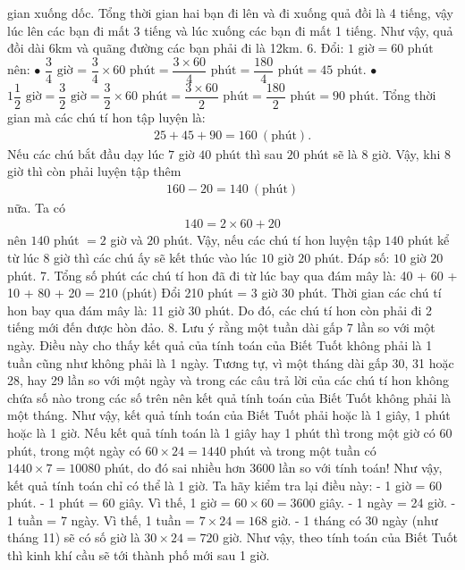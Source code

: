 gian xuống dốc. Tổng thời gian hai bạn đi lên và đi xuống quả đồi là 4 tiếng, vậy lúc lên các bạn đi mất 3 tiếng và lúc xuống các bạn đi mất 1 tiếng.
Như vậy, quả đồi dài 6km và quãng đường các bạn phải đi là 12km.
\vskip 0.1cm
6. Đổi: $1 \mbox{ giờ} = 60 \mbox{ phút}$ nên: 
\vskip 0.1cm
$\bullet$ $\dfrac{3}{4} \mbox{ giờ}$ = $\dfrac{3}{4}\times 60 \mbox{ phút}= \dfrac{3\times 60}{4}  \mbox{ phút}= \dfrac{180}{4}  \mbox{ phút}= 45 \mbox{ phút}.$ 
\vskip 0.1cm
$\bullet$ $1\dfrac{1}{2} \mbox{ giờ}= \dfrac{3}{2} \mbox{ giờ} = \dfrac{3}{2}\times 60  \mbox{ phút}= \dfrac{3\times 60}{2}  \mbox{ phút}= \dfrac{180}{2}  \mbox{ phút}= 90 \mbox{ phút}.$
\vskip 0.1cm
Tổng thời gian mà các chú tí hon tập luyện là:
\begin{align*}
	25 + 45 + 90= 160 \ (\textrm{phút}).
\end{align*}
Nếu các chú bắt đầu dạy lúc $7$ giờ $40$ phút thì sau $20$ phút sẽ là $8$ giờ. Vậy, khi 8 giờ thì còn phải luyện tập thêm
\begin{align*}
	160-20=140\ (\textrm{phút})
\end{align*}
nữa. Ta có 
\begin{align*}
	140= 2\times 60 +20
\end{align*}
nên $140$ phút $=2$ giờ và $20$ phút. Vậy, nếu các chú tí hon luyện tập $140$ phút kể từ lúc $8$ giờ thì các chú ấy sẽ kết thúc vào lúc  $10$ giờ $20$ phút.
\vskip 0.1cm
Đáp số: $10$ giờ $20$ phút.
\vskip 0.1cm
7.
\vskip 0.1cm
Tổng số phút các chú tí hon đã đi từ lúc bay qua đám mây là:
\vskip 0.1cm
40 + 60 + 10 + 80 + 20 = 210 (phút)
\vskip 0.1cm
Đổi 210 phút  = 3 giờ 30 phút.
\vskip 0.1cm
Thời gian các chú tí hon bay qua đám mây là: 11 giờ 30 phút. Do đó, các chú tí hon còn phải đi 2 tiếng mới đến được hòn đảo.
\vskip 0.1cm
8. 
\vskip 0.1cm
Lưu ý rằng một tuần dài gấp 7 lần so với một ngày. Điều này cho thấy kết quả của tính toán của Biết Tuốt không phải là 1 tuần cũng như không phải là 1 ngày. Tương tự, vì một tháng dài gấp 30, 31 hoặc 28, hay 29 lần so với một ngày và trong các câu trả lời của các chú tí hon không chứa số nào trong các số trên nên kết quả tính toán của Biết Tuốt không phải là một tháng. Như vậy, kết quả tính toán của Biết Tuốt phải hoặc là 1 giây, 1 phút hoặc là 1 giờ. Nếu kết quả tính toán là 1 giây hay 1 phút thì trong một giờ có 60 phút, trong một ngày có $60 \times 24 = 1440$ phút và trong một tuần có $1440\times 7 = 10080$ phút, do đó sai nhiều hơn 3600 lần so với tính toán! Như vậy, kết quả tính toán chỉ có thể là 1 giờ. Ta hãy kiểm tra lại điều này: - 1 giờ = 60 phút. - 1 phút = 60 giây. Vì thế, 1 giờ = $60\times 60 = 3600$ giây. - 1 ngày = 24 giờ. - 1 tuần = 7 ngày. Vì thế, 1 tuần = $7\times 24 = 168$ giờ. - 1 tháng có 30 ngày (như tháng 11) sẽ có số giờ là $30\times 24 = 720$ giờ. Như vậy, theo tính toán của Biết Tuốt thì kinh khí cầu sẽ tới thành phố mới sau 1 giờ.
